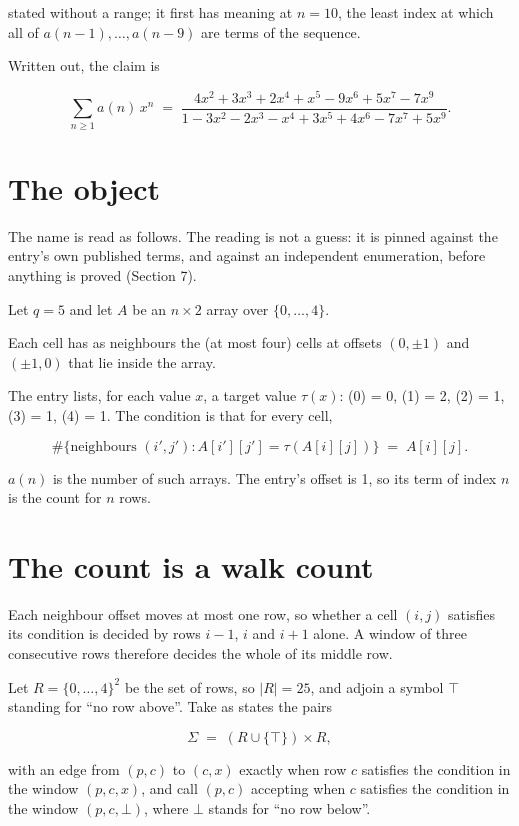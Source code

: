 \documentclass[11pt]{article}
\theoremstyle{definition}
\begin{document}
stated without a range; it first has meaning at $n = 10$, the least index at which all of $a(n-1),\dots,a(n-9)$ are terms of the sequence.

Written out, the claim is

\[\sum_{n \ge 1} a(n)\,x^n \;=\; \frac{4x^{2} + 3x^{3} + 2x^{4} + x^{5} - 9x^{6} + 5x^{7} - 7x^{9}}{1 - 3x^{2} - 2x^{3} - x^{4} + 3x^{5} + 4x^{6} - 7x^{7} + 5x^{9}}.\]

\section{The object}

The name is read as follows. The reading is not a guess: it is pinned against the entry's own published terms, and against an independent enumeration, before anything is proved (Section 7).

Let $q = 5$ and let $A$ be an $n \times 2$ array over $\{0,\dots,4\}$.

Each cell has as neighbours the (at most four) cells at offsets $(0,\pm1)$ and $(\pm1,0)$ that lie inside the array.

The entry lists, for each value $x$, a target value $\tau(x)$: \tau(0) = 0, \tau(1) = 2, \tau(2) = 1, \tau(3) = 1, \tau(4) = 1. The condition is that for every cell,

\[\#\{\text{neighbours } (i',j') : A[i'][j'] = \tau(A[i][j])\} \;=\; A[i][j].\]

$a(n)$ is the number of such arrays. The entry's offset is 1, so its term of index $n$ is the count for $n$ rows.

\section{The count is a walk count}

Each neighbour offset moves at most one row, so whether a cell $(i,j)$ satisfies its condition is decided by rows $i-1$, $i$ and $i+1$ alone. A window of three consecutive rows therefore decides the whole of its middle row.

Let $R = \{0,\dots,4\}^{2}$ be the set of rows, so $|R| = 25$, and adjoin a symbol $\top$ standing for ``no row above''. Take as states the pairs

\[\Sigma \;=\; (R \cup \{\top\}) \times R,\]

with an edge from $(p,c)$ to $(c,x)$ exactly when row $c$ satisfies the condition in the window $(p,c,x)$, and call $(p,c)$ accepting when $c$ satisfies the condition in the window $(p,c,\bot)$, where $\bot$ stands for ``no row below''.
\end{document}
